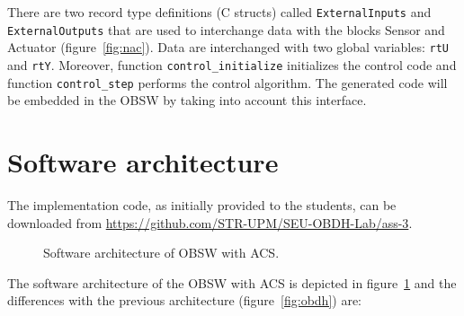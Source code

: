 There are two record type definitions (C structs) called \texttt{ExternalInputs} and \texttt{ExternalOutputs}
that are used to interchange data with the blocks
Sensor and Actuator (figure~\ref{fig:nac}).
Data are interchanged with two global variables: \texttt{rtU} and \texttt{rtY}.
Moreover, function \texttt{control\_initialize}
initializes the control code and function \texttt{control\_step}
performs the control algorithm.
The generated code will be embedded in the OBSW by taking into account this interface.

\section{Software architecture}

The implementation code, as initially provided to the students, can be downloaded from \url{https://github.com/STR-UPM/SEU-OBDH-Lab/ass-3}.

\begin{figure}[H]
            \caption{Software architecture of OBSW with ACS.}
            \label{fig:obdh-acs}
\end{figure}

The software architecture of the OBSW with ACS is depicted in figure~\ref{fig:obdh-acs} and the differences with the previous architecture (figure~\ref{fig:obdh}) are:

